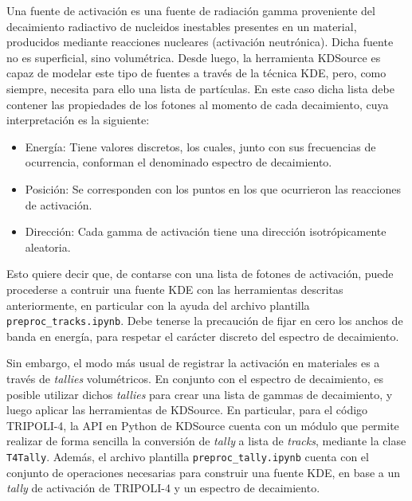 Una fuente de activación es una fuente de radiación gamma proveniente del decaimiento radiactivo de nucleidos inestables presentes en un material, producidos mediante reacciones nucleares (activación neutrónica). Dicha fuente no es superficial, sino volumétrica. Desde luego, la herramienta KDSource es capaz de modelar este tipo de fuentes a través de la técnica KDE, pero, como siempre, necesita para ello una lista de partículas. En este caso dicha lista debe contener las propiedades de los fotones al momento de cada decaimiento, cuya interpretación es la siguiente:
\begin{itemize}
	\item Energía: Tiene valores discretos, los cuales, junto con sus frecuencias de ocurrencia, conforman el denominado espectro de decaimiento.
	\item Posición: Se corresponden con los puntos en los que ocurrieron las reacciones de activación.
	\item Dirección: Cada gamma de activación tiene una dirección isotrópicamente aleatoria.
\end{itemize}

Esto quiere decir que, de contarse con una lista de fotones de activación, puede procederse a contruir una fuente KDE con las herramientas descritas anteriormente, en particular con la ayuda del archivo plantilla \verb|preproc_tracks.ipynb|. Debe tenerse la precaución de fijar en cero los anchos de banda en energía, para respetar el carácter discreto del espectro de decaimiento.

Sin embargo, el modo más usual de registrar la activación en materiales es a través de \emph{tallies} volumétricos. En conjunto con el espectro de decaimiento, es posible utilizar dichos \emph{tallies} para crear una lista de gammas de decaimiento, y luego aplicar las herramientas de KDSource. En particular, para el código TRIPOLI-4, la API en Python de KDSource cuenta con un módulo que permite realizar de forma sencilla la conversión de \emph{tally} a lista de \emph{tracks}, mediante la clase \verb|T4Tally|. Además, el archivo plantilla \verb|preproc_tally.ipynb| cuenta con el conjunto de operaciones necesarias para construir una fuente KDE, en base a un \emph{tally} de activación de TRIPOLI-4 y un espectro de decaimiento. 
